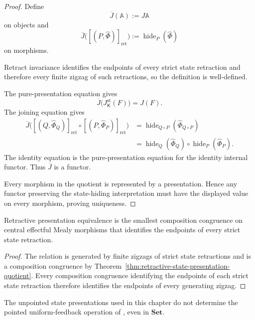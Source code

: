 \begin{proof}
Define
\[
    \overline J(\mathbb A)
    :=
    J\mathbb A
\]
on objects and
\[
    \overline J
    \bigl(
        [(P,\widehat\Phi)]_{\mathrm{ret}}
    \bigr)
    :=
    \operatorname{hide}_P(\widehat\Phi)
\]
on morphisms.

Retract invariance identifies the endpoints of every strict state retraction
and therefore every finite zigzag of such retractions, so the definition is
well-defined.

The pure-presentation equation gives
\[
    \overline J
    \bigl(
        J^{\mathrm{st}}_{\mathsf K}(F)
    \bigr)
    =
    J(F).
\]
The joining equation gives
\[
\begin{aligned}
\overline J
\bigl(
    [(Q,\widehat\Phi_Q)]_{\mathrm{ret}}
    \circ
    [(P,\widehat\Phi_P)]_{\mathrm{ret}}
\bigr)
&=
\operatorname{hide}_{Q\circ P}
(\widehat\Phi_{Q\circ P})
\\
&=
\operatorname{hide}_Q(\widehat\Phi_Q)
\circ
\operatorname{hide}_P(\widehat\Phi_P).
\end{aligned}
\]
The identity equation is the pure-presentation equation for the identity
internal functor.  Thus \(\overline J\) is a functor.

Every morphism in the quotient is represented by a presentation.  Hence any
functor preserving the state-hiding interpretation must have the displayed
value on every morphism, proving uniqueness.
\end{proof}

\begin{corollary}
\label{cor:retractive-presentation-congruence}
Retractive presentation equivalence is the smallest composition congruence on
central effectful Mealy morphisms that identifies the endpoints of every
strict state retraction.
\end{corollary}

\begin{proof}
The relation is generated by finite zigzags of strict state retractions and
is a composition congruence by
Theorem~\ref{thm:retractive-state-presentation-quotient}.  Every composition
congruence identifying the endpoints of each strict state retraction
therefore identifies the endpoints of every generating zigzag.
\end{proof}

\begin{proposition}
\label{prop:unpointed-not-pointed-feedback}
The unpointed state presentations used in this chapter do not determine the
pointed uniform-feedback operation of
\cite{BonchiDiLavoreRomanEffectfulMealyMachines}, even in
\(\mathbf{Set}\).
\end{proposition}

